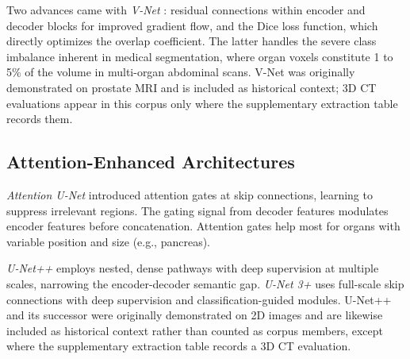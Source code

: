 Two advances came with \emph{V-Net} \cite{milletari2016vnet}: residual connections within encoder and decoder blocks for improved gradient flow, and the Dice loss function, which directly optimizes the overlap coefficient. The latter handles the severe class imbalance inherent in medical segmentation, where organ voxels constitute 1 to 5\% of the volume in multi-organ abdominal scans. V-Net was originally demonstrated on prostate MRI and is included as historical context; 3D CT evaluations appear in this corpus only where the supplementary extraction table records them.

\subsection{Attention-Enhanced Architectures}

\emph{Attention U-Net} \cite{oktay2018attention} introduced attention gates at skip connections, learning to suppress irrelevant regions. The gating signal from decoder features modulates encoder features before concatenation. Attention gates help most for organs with variable position and size (e.g., pancreas).

\emph{U-Net++} \cite{zhou2018unetpp} employs nested, dense pathways with deep supervision at multiple scales, narrowing the encoder-decoder semantic gap. \emph{U-Net 3+} \cite{huang2020unet3plus} uses full-scale skip connections with deep supervision and classification-guided modules. U-Net++ and its successor were originally demonstrated on 2D images and are likewise included as historical context rather than counted as corpus members, except where the supplementary extraction table records a 3D CT evaluation.

